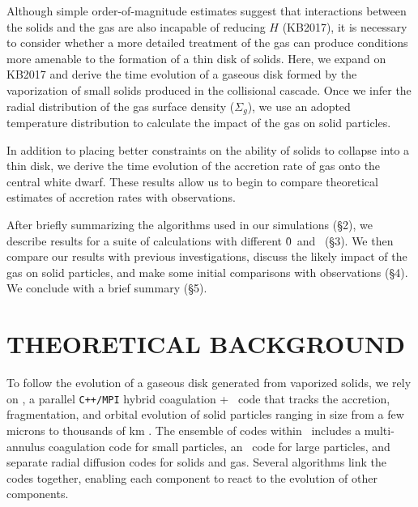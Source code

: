 \documentclass[12pt,preprint]{aastex}
\begin{document}
Although simple order-of-magnitude estimates suggest that interactions between the 
solids and the gas are also incapable of reducing $H$ (KB2017), it is necessary
to consider whether a more detailed treatment of the gas can produce conditions
more amenable to the formation of a thin disk of solids. Here, we expand on KB2017 
and derive the time evolution of a gaseous disk formed by the vaporization of small
solids produced in the collisional cascade. Once we infer the radial distribution
of the gas surface density ($\Sigma_g$), we use an adopted temperature distribution 
to calculate the impact of the gas on solid particles.

In addition to placing better constraints on the ability of solids to collapse 
into a thin disk, we derive the time evolution of the accretion rate of gas onto
the central white dwarf. These results allow us to begin to compare theoretical
estimates of accretion rates with observations.

After briefly summarizing the algorithms used in our simulations (\S2), we describe 
results for a suite of calculations with different \r0\ and \mdotz\ (\S3).  
We then compare our results with previous investigations, discuss the likely impact 
of the gas on solid particles, and make some initial comparisons with observations (\S4).  
We conclude with a brief summary (\S5).

\section{THEORETICAL BACKGROUND}
\label{sec: back}

To follow the evolution of a gaseous disk generated from vaporized solids,
we rely on \orch, a parallel \verb!C++/MPI! hybrid coagulation + 
\nbody\ code that tracks the accretion, fragmentation, and orbital evolution 
of solid particles ranging in size from a few microns to thousands of km 
\citep{kb2001,kb2004a,kb2008,bk2011a,bk2011b,kb2016a}. 
The ensemble of codes within \orch\ includes a multi-annulus coagulation 
code for small particles, an \nbody\ code for large particles, and 
separate radial diffusion codes for solids and gas.  Several algorithms 
link the codes together, enabling each component to react to the evolution 
of other components.
\end{document}
